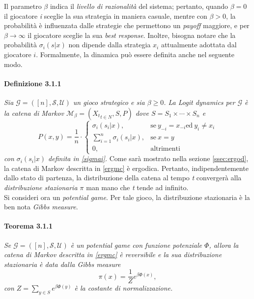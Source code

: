 Il parametro $\beta$ indica il \textit{livello di razionalità} del sistema; pertanto, quando $\beta = 0$ il giocatore \textit{i} sceglie la sua strategia in maniera casuale, mentre con $\beta > 0$, la probabilità è influenzata dalle strategie che permettono un \textit{payoff} maggiore, e per $\beta \rightarrow \infty$ il giocatore sceglie la sua \textit{best response}. Inoltre, bisogna notare che la probabilità $\sigma_i (s|x)$ non dipende dalla strategia $x_i$ attualmente adottata dal giocatore $i$.
Formalmente, la dinamica può essere definita anche nel seguente modo.
\paragraph{Definizione 3.1.1} \textit{Sia $\mathcal{G} = ([n], \mathcal{S}, \mathcal{U})$ un gioco strategico e sia $\beta \geq 0$. La Logit dynamics per $\mathcal{G}$ è la catena di Markov $\mathcal{M}_{\beta} = ({X_t}_{t \in N}, S, P)$ dove $S = S_1 \times \cdots \times S_n$ e}
\begin{equation}
	P(x, y) = \frac{1}{n} \cdot 
	\begin{cases}
	\sigma_i(s_i|x), & \text{se}\ y_{-i} = x_{-i} \text{ed}\ y_i \neq x_i\\
	\sum_{i=1}^{n}{\sigma_i(s_i|x)}, & \text{se}\ x = y\\
	0, & \text{altrimenti}
	\end{cases}
	\label{ergmc}
\end{equation}
\textit{con $\sigma_i(s_i|x)$ definita in \ref{sigmai}.}
Come sarà mostrato nella sezione \ref{ssec:ergod}, la catena di Markov descritta in \ref{ergmc} è ergodica. Pertanto, indipendentemente dallo stato di partenza, la distribuzione della catena al tempo \textit{t} convergerà alla \textit{distribuzione stazionaria $\pi$} man mano che \textit{t} tende ad infinito.\\
Si consideri ora un \textit{potential game}. Per tale gioco, la distribuzione stazionaria è la ben nota \textit{Gibbs measure}.
\paragraph{Teorema 3.1.1} \textit{Se $\mathcal{G} = ([n], \mathcal{S}, \mathcal{U})$ è un potential game con funzione potenziale $\Phi$, allora la catena di Markov descritta in \ref{ergmc} è reversibile e la sua distribuzione stazionaria è data dalla Gibbs measure}
\begin{equation}
	\pi(x) = \frac{1}{Z}{e^{\beta\Phi(x)}},
	\label{gibbsm}
\end{equation}
\textit{con $Z = \sum_{y\in S}{e^{\beta\Phi(y)}}$ è la costante di normalizzazione.}

